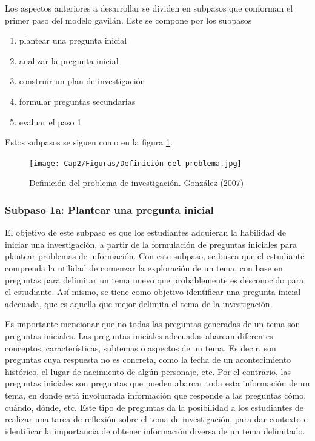 Los aspectos anteriores a desarrollar se dividen en subpasos que conforman el primer paso del modelo gavilán. Este se compone por los subpasos

\begin{enumerate}
  \item plantear una pregunta inicial
  \item analizar la pregunta inicial
  \item construir un plan de investigación
  \item formular preguntas secundarias
  \item evaluar el paso 1
\end{enumerate}

Estos subpasos se siguen como en la figura \ref{fig:23}.

\begin{figure}
  \centering
  \texttt{[image: Cap2/Figuras/Definición del problema.jpg]}
  \caption{Definición del problema de investigación. González (2007)}
  \label{fig:23}
\end{figure}


\subsubsection{Subpaso 1a: Plantear una pregunta inicial}
\label{secPaso1aCap2}

El objetivo de este subpaso es que los estudiantes adquieran la habilidad de iniciar una investigación, a partir de la formulación de preguntas iniciales para plantear problemas de información. Con este subpaso, se busca que el estudiante comprenda la utilidad de comenzar la exploración de un tema, con base en preguntas para delimitar un tema nuevo que probablemente es desconocido para el estudiante. Así mismo, se tiene como objetivo identificar una pregunta inicial adecuada, que es aquella que mejor delimita el tema de la investigación.

Es importante mencionar que no todas las preguntas generadas de un tema son preguntas iniciales. Las preguntas iniciales adecuadas abarcan diferentes conceptos, características, subtemas o aspectos de un tema. Es decir, son preguntas cuya respuesta no es concreta, como la fecha de un acontecimiento histórico, el lugar de nacimiento de algún personaje, etc. Por el contrario, las preguntas iniciales son preguntas que pueden abarcar toda esta información de un tema, en donde está involucrada información que responde a las preguntas cómo, cuándo, dónde, etc. Este tipo de preguntas da la posibilidad a los estudiantes de realizar una tarea de reflexión sobre el tema de investigación, para dar contexto e identificar la importancia de obtener información diversa de un tema delimitado.

